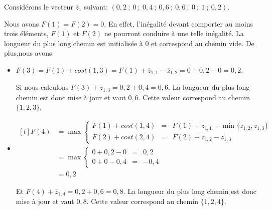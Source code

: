 \begin{ex}
Considérons le vecteur $\overline{z}_1$ suivant: $(0,2\ ;\ 0\ ;\
0,4\ ;\ 0,6\ ;\ 0,6\ ;\ 0\ ;\ 1\ ;\ 0,2)$.

Nous avons $F(1)=F(2)=0$. En effet, l'inégalité devant comporter au moins
trois éléments, $F(1)$ et $F(2)$ ne pourront conduire à une telle
inégalité. La longueur du plus long chemin est initialisée à $0$ et
correspond au chemin vide. De plus,nous avons: 
\begin{itemize}
\item $F(3) =  F(1) + cost (1,3) = F(1) + \overline{z}_{1,1} -
  \overline{z}_{1,2} = 0 + 0,2 - 0= 0,2 $. 
  
  Si nous calculons $F(3)+\overline{z}_{1,3}=0,2+0,4=0,6$. La
  longueur du plus long chemin est donc mise à jour et vaut
  $0,6$. Cette valeur correspond au chemin $\{1,2,3\}$.
\item $\begin{aligned}[t] 
    F(4) &=  \max \left\{
        \begin{array}{lcl}
          F(1) + cost (1,4) & = & F(1) + \overline{z}_{1,1}  -
                              \min\{\overline{z}_{1,2},\overline{z}_{1,3}\}  \\
          F(2) + cost (2,4) &= & F(2) + \overline{z}_{1,2} -
                              \overline{z}_{1,3}     
        \end{array} \right.\\
    &=  \max \left\{ 
        \begin{array}{lcl}
          0 + 0,2 - 0 &=& 0,2\\
          0 + 0 - 0,4 &= &-0,4 
        \end{array} \right.\\
    &=  0,2
  \end{aligned}$

  Et $F(4)+\overline{z}_{1,4}=0,2+0,6=0,8$. La
  longueur du plus long chemin est donc mise à jour et vaut
  $0,8$. Cette valeur correspond au chemin $\{1,2,4\}$.


\end{itemize}
\end{ex}
